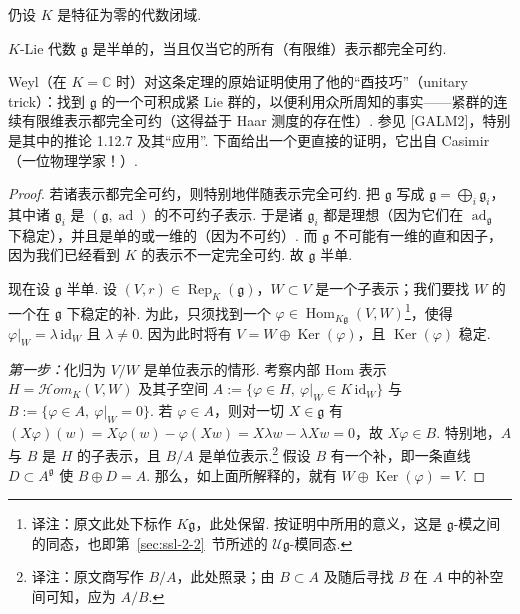 \begin{numpara}[借助表示的刻画]\label{np:ssl-2-5-3}
仍设 $K$ 是特征为零的代数闭域.
\begin{theorem*}[Weyl]
$K$-Lie 代数 $\mathfrak g$ 是半单的，当且仅当它的所有（有限维）表示都完全可约.
\end{theorem*}
Weyl（在 $K=\mathbb{C}$ 时）对这条定理的原始证明使用了他的``酉技巧''（unitary trick）：找到 $\mathfrak g$ 的一个可积成紧 Lie 群的，以便利用众所周知的事实——紧群的连续有限维表示都完全可约（这得益于 Haar 测度的存在性）. 参见 [GALM2]，特别是其中的推论 1.12.7 及其``应用''. 下面给出一个更直接的证明，它出自 Casimir（一位物理学家！）.
\begin{proof}
若诸表示都完全可约，则特别地伴随表示完全可约. 把 $\mathfrak g$ 写成 $\mathfrak g=\bigoplus_i\mathfrak g_i$，其中诸 $\mathfrak g_i$ 是 $(\mathfrak g,\operatorname{ad})$ 的不可约子表示. 于是诸 $\mathfrak g_i$ 都是理想（因为它们在 $\operatorname{ad}_{\mathfrak g}$ 下稳定），并且是单的或一维的（因为不可约）. 而 $\mathfrak g$ 不可能有一维的直和因子，因为我们已经看到 $K$ 的表示不一定完全可约. 故 $\mathfrak g$ 半单.

现在设 $\mathfrak g$ 半单. 设 $(V,r)\in\operatorname{Rep}_K(\mathfrak g)$，$W\subset V$ 是一个子表示；我们要找 $W$ 的一个在 $\mathfrak g$ 下稳定的补. 为此，只须找到一个 $\varphi\in\operatorname{Hom}_{K\mathfrak g}(V,W)$\footnote{译注：原文此处下标作 $K\mathfrak g$，此处保留. 按证明中所用的意义，这是 $\mathfrak g$-模之间的同态，也即第~\ref{sec:ssl-2-2}~节所述的 $\mathcal U\mathfrak g$-模同态.}，使得 $\varphi|_W=\lambda\,\mathrm{id}_W$ 且 $\lambda\neq 0$. 因为此时将有 $V=W\oplus\operatorname{Ker}(\varphi)$，且 $\operatorname{Ker}(\varphi)$ 稳定.

\emph{第一步：}化归为 $V/W$ 是单位表示的情形. 考察内部 $\mathrm{Hom}$ 表示 $H=\mathcal{H}om_K(V,W)$ 及其子空间 $A:=\{\varphi\in H,\ \varphi|_W\in K\,\mathrm{id}_W\}$ 与 $B:=\{\varphi\in A,\ \varphi|_W=0\}$. 若 $\varphi\in A$，则对一切 $X\in\mathfrak g$ 有 $(X\varphi)(w)=X\varphi(w)-\varphi(Xw)=X\lambda w-\lambda Xw=0$，故 $X\varphi\in B$. 特别地，$A$ 与 $B$ 是 $H$ 的子表示，且 $B/A$ 是单位表示.\footnote{译注：原文商写作 $B/A$，此处照录；由 $B\subset A$ 及随后寻找 $B$ 在 $A$ 中的补空间可知，应为 $A/B$.} 假设 $B$ 有一个补，即一条直线 $D\subset A^{\mathfrak g}$ 使 $B\oplus D=A$. 那么，如上面所解释的，就有 $W\oplus\operatorname{Ker}(\varphi)=V$.


\end{proof}
\end{numpara}
